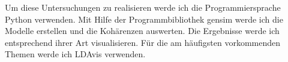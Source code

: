 Um diese Untersuchungen zu realisieren werde ich die Programmiersprache Python verwenden. Mit Hilfe der Programmbibliothek gensim \parencite[vgl.][]{rehurek_lrec} werde ich die Modelle erstellen und die Kohärenzen auswerten. Die Ergebnisse werde ich entsprechend ihrer Art visualisieren. Für die am häufigsten vorkommenden Themen werde ich LDAvis verwenden. \parencite[vgl.][]{sievert2014ldavis}













